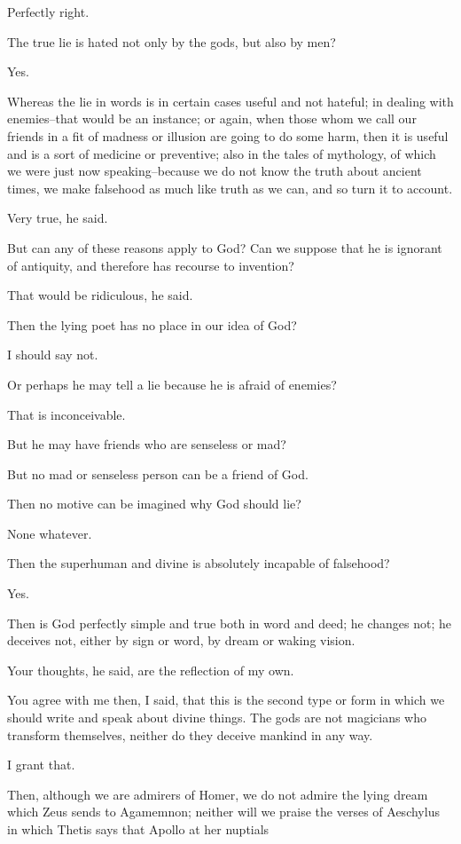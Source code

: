 Perfectly right.

The true lie is hated not only by the gods, but also by men?

Yes.

Whereas the lie in words is in certain cases useful and not hateful; in
dealing with enemies--that would be an instance; or again, when those
whom we call our friends in a fit of madness or illusion are going to
do some harm, then it is useful and is a sort of medicine or
preventive; also in the tales of mythology, of which we were just now
speaking--because we do not know the truth about ancient times, we make
falsehood as much like truth as we can, and so turn it to account.

Very true, he said.

But can any of these reasons apply to God? Can we suppose that he is
ignorant of antiquity, and therefore has recourse to invention?

That would be ridiculous, he said.

Then the lying poet has no place in our idea of God?

I should say not.

Or perhaps he may tell a lie because he is afraid of enemies?

That is inconceivable.

But he may have friends who are senseless or mad?

But no mad or senseless person can be a friend of God.

Then no motive can be imagined why God should lie?

None whatever.

Then the superhuman and divine is absolutely incapable of falsehood?

Yes.

Then is God perfectly simple and true both in word and deed; he changes
not; he deceives not, either by sign or word, by dream or waking vision.

Your thoughts, he said, are the reflection of my own.

You agree with me then, I said, that this is the second type or form in
which we should write and speak about divine things. The gods are not
magicians who transform themselves, neither do they deceive mankind in
any way.

I grant that.

Then, although we are admirers of Homer, we do not admire the lying
dream which Zeus sends to Agamemnon; neither will we praise the verses
of Aeschylus in which Thetis says that Apollo at her nuptials


